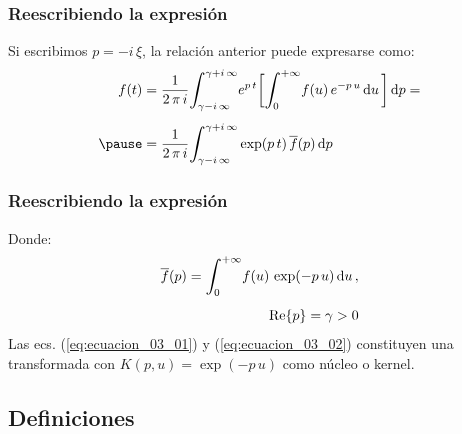 \begin{frame}
\frametitle{Reescribiendo la expresión}
Si escribimos $p = - i \, \xi$, la relación anterior puede expresarse como:
\pause
\begin{eqnarray}
\begin{aligned}[b]
f (t) &= \dfrac{1}{2 \, \pi \, i} \scaleint{6ex}_{\bs \gamma -i \, \infty}^{\gamma + i \, \infty} e^{p \, t} \bigg[ \scaleint{6ex}_{\bs 0}^{+\infty} f (u) \, e^{- p \, u} \dd{u} \bigg] \dd{p} = \\[0.5em] \pause
&= \dfrac{1}{2 \, \pi \, i} \scaleint{6ex}_{\bs \gamma -i \, \infty}^{\gamma + i \, \infty} \exp(p \, t) \, \overline{f} (p) \dd{p} 
\end{aligned}
\label{eq:ecuacion_03_01}
\end{eqnarray}
\end{frame}
\begin{frame}
\frametitle{Reescribiendo la expresión}
Donde:
\pause
\begin{align}
\begin{aligned}
\overline{f} (p) = \scaleint{6ex}_{\bs 0}^{+\infty} f (u) \, \exp(- p \, u) \dd{u}, \\[0.5em]
\Re{p} = \gamma > 0
\end{aligned}
\label{eq:ecuacion_03_02}
\end{align}
\pause
Las ecs. (\ref{eq:ecuacion_03_01}) y (\ref{eq:ecuacion_03_02}) constituyen una transformada con $K (p, u) = \exp(- p \, u)$ como núcleo o kernel.
\end{frame}

\subsection{Definiciones}


